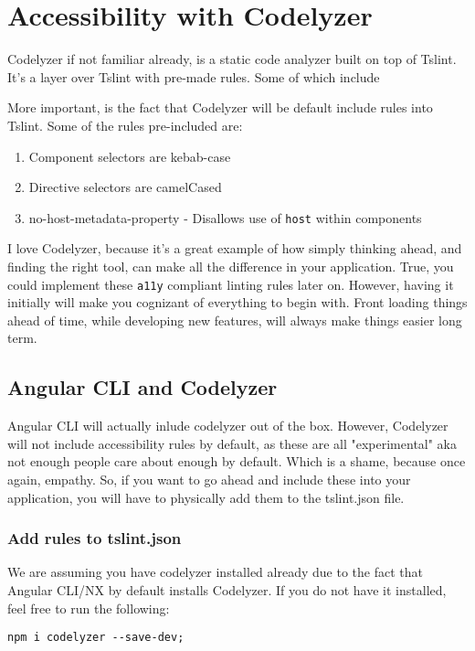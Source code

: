 \chapter{ Accessibility with Codelyzer}    
Codelyzer if not familiar already, is a static code analyzer built on top of Tslint. It's a layer over Tslint with pre-made rules. Some of which include 

More important, is the fact that Codelyzer will be default include rules into Tslint. Some of the rules pre-included are: 
\begin{enumerate}
  \item Component selectors are kebab-case
  \item Directive selectors are camelCased
  \item no-host-metadata-property - Disallows use of \lstinline{host} within components
\end{enumerate}

I love Codelyzer, because it's a great example of how simply thinking ahead, and finding the right tool, can make all the difference in your application. True, you could implement these \lstinline{a11y} compliant linting rules later on. However, having it initially will make you cognizant of everything to begin with. Front loading things ahead of time, while developing new features, will always make things easier long term. 

\section{Angular CLI and Codelyzer}
Angular CLI will actually inlude codelyzer out of the box. However, Codelyzer will not include accessibility rules by default, as these are all "experimental" aka not enough people care about enough by default. Which is a shame, because once again, empathy. So, if you want to go ahead and include these into your application, you will have to physically add them to the tslint.json file. 

\subsection{Add rules to tslint.json}
We are assuming you have codelyzer installed already due to the fact that Angular CLI/NX by default installs Codelyzer. If you do not have it installed, feel free to run the following: 
\begin{verbatim}
npm i codelyzer --save-dev;
\end{verbatim}

